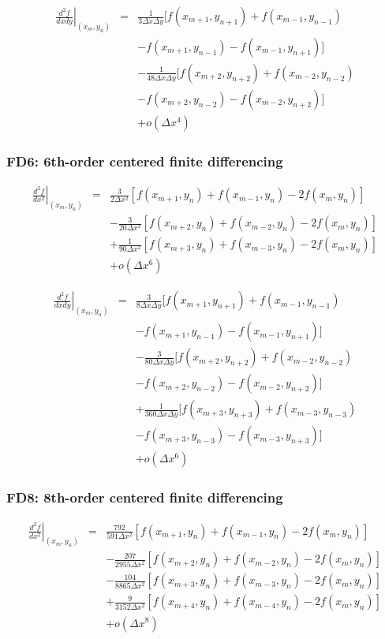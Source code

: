 \documentclass[11pt]{article}
\def\bea{\begin{eqnarray}}
\def\eea{\end{eqnarray}}
\begin{document}
\bea \left.\frac{d^2f}{dxdy}\right|_{(x_m,y_n)} &=&
\frac{1}{3\Delta
x\Delta y}[f(x_{m+1},y_{n+1})+f(x_{m-1},y_{n-1})\nonumber\\
&&-f(x_{m+1},y_{n-1})-f(x_{m-1},y_{n+1})]\nonumber\\
&&-\frac{1}{48\Delta
x\Delta y}[f(x_{m+2},y_{n+2})+f(x_{m-2},y_{n-2})\nonumber\\
&&-f(x_{m+2},y_{n-2})-f(x_{m-2},y_{n+2})]\nonumber\\
&&+o(\Delta x^4) \eea

\subsubsection*{FD6: 6th-order centered finite differencing}
\bea \left.\frac{d^2f}{dx^2}\right|_{(x_m,y_n)}
&=& \frac{3}{2\Delta
x^2}[f(x_{m+1},y_n)+f(x_{m-1},y_n)-2f(x_m,y_n)]\nonumber\\
&&-\frac{3}{20\Delta
x^2}[f(x_{m+2},y_n)+f(x_{m-2},y_n)-2f(x_m,y_n)]\nonumber\\
&&+\frac{1}{90\Delta
x^2}[f(x_{m+3},y_n)+f(x_{m-3},y_n)-2f(x_m,y_n)]\nonumber\\
&&+o(\Delta x^6) \eea

\bea \left.\frac{d^2f}{dxdy}\right|_{(x_m,y_n)} &=&
\frac{3}{8\Delta
x\Delta y}[f(x_{m+1},y_{n+1})+f(x_{m-1},y_{n-1})\nonumber\\
&&-f(x_{m+1},y_{n-1})-f(x_{m-1},y_{n+1})]\nonumber\\
&&-\frac{3}{80\Delta
x\Delta y}[f(x_{m+2},y_{n+2})+f(x_{m-2},y_{n-2})\nonumber\\
&&-f(x_{m+2},y_{n-2})-f(x_{m-2},y_{n+2})]\nonumber\\
&&+\frac{1}{360\Delta
x\Delta y}[f(x_{m+3},y_{n+3})+f(x_{m-3},y_{n-3})\nonumber\\
&&-f(x_{m+3},y_{n-3})-f(x_{m-3},y_{n+3})]\nonumber\\
&&+o(\Delta x^6) \eea

\subsubsection*{FD8: 8th-order centered finite differencing}
\bea \left.\frac{d^2f}{dx^2}\right|_{(x_m,y_n)}
&=& \frac{792}{591\Delta
x^2}[f(x_{m+1},y_n)+f(x_{m-1},y_n)-2f(x_m,y_n)]\nonumber\\
&&-\frac{207}{2955\Delta
x^2}[f(x_{m+2},y_n)+f(x_{m-2},y_n)-2f(x_m,y_n)]\nonumber\\
&&-\frac{104}{8865\Delta
x^2}[f(x_{m+3},y_n)+f(x_{m-3},y_n)-2f(x_m,y_n)]\nonumber\\
&&+\frac{9}{3152\Delta
x^2}[f(x_{m+4},y_n)+f(x_{m-4},y_n)-2f(x_m,y_n)]\nonumber\\
&&+o(\Delta x^8) \eea
\end{document}
